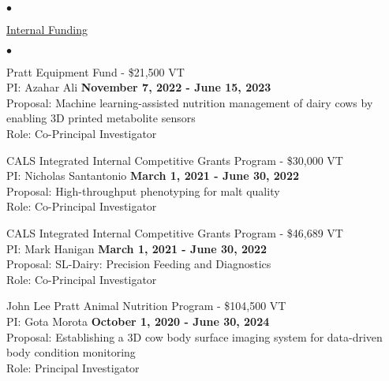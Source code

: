 \documentclass[margin,line,10pt]{res}
\newenvironment{list2}{
  \begin{list}{$\bullet$}{%
      \setlength{\itemsep}{0in}
      \setlength{\parsep}{0in} \setlength{\parskip}{0in}
      \setlength{\topsep}{0in} \setlength{\partopsep}{0in} 
      \setlength{\leftmargin}{0.2in}}}{\end{list}}
\begin{document}
\begin{resume}
\begin{list2}
\end{list2}




\begin{flushleft}
\hspace{0.2cm} \underline{Internal Funding}
\end{flushleft}
\begin{list2}


  \item Pratt Equipment Fund - \$21,500  \hfill VT\\
  PI: Azahar Ali \hfill \textbf{November 7, 2022 - June 15, 2023}\\
  Proposal: Machine learning-assisted nutrition management of dairy cows by enabling 3D printed metabolite sensors\\
  Role: Co-Principal Investigator \\
  
  \vspace{0.5cm}

  \item CALS Integrated Internal Competitive Grants Program  - \$30,000  \hfill VT\\
PI: Nicholas Santantonio \hfill \textbf{March 1, 2021 - June 30, 2022}\\
Proposal: High-throughput phenotyping for malt quality\\
Role: Co-Principal Investigator \\

\vspace{0.5cm}


 \item CALS Integrated Internal Competitive Grants Program  - \$46,689  \hfill VT\\
PI: Mark Hanigan \hfill \textbf{March 1, 2021 - June 30, 2022}\\
Proposal: SL-Dairy: Precision Feeding and Diagnostics\\
Role: Co-Principal Investigator \\


\vspace{0.5cm}

\item John Lee Pratt Animal Nutrition Program - \$104,500  \hfill VT\\
PI: Gota Morota \hfill \textbf{October 1, 2020 - June 30, 2024}\\
Proposal: Establishing a 3D cow body surface imaging system for data-driven body condition monitoring\\
Role: Principal Investigator \\



\end{list2}
\end{resume}
\end{document}
